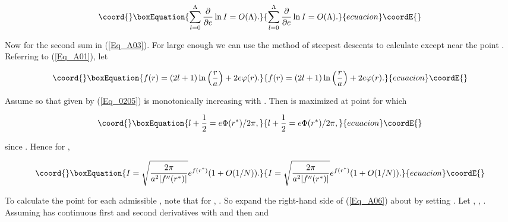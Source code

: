 \documentclass[a4paper,twocolumn,showpacs,preprintnumbers,amsmath,amssymb]{revtex4}
\providecommand{\half}{\frac{1}{2}}
\providecommand{\pdo}[1]{\ensuremath{\frac{\partial }
        {\partial #1 }}}
\begin{document}
\begin{equation}\coord{}\boxEquation{
\label{Eq_A04}
\sum^{\Lambda}_{l=0} \pdo{e} \ln I = O(\Lambda).
}{
\sum^{\Lambda}_{l=0} \pdo{e} \ln I = O(\Lambda).
}{ecuacion}\coordE{}\end{equation} 

Now for the second sum in (\ref{Eq_A03}). For \myHighlight{$\Lambda$}\coordHE{} large enough
we can use the method of steepest descents to calculate \coordHE{} except
near the point \coordHE{}. Referring to (\ref{Eq_A01}), let

\begin{equation}\coord{}\boxEquation{
\label{Eq_A05}
f(r) = (2l+1) \ln \left(\frac{r}{a}\right) + 2e \varphi(r).
}{
f(r) = (2l+1) \ln \left(\frac{r}{a}\right) + 2e \varphi(r).
}{ecuacion}\coordE{}\end{equation}

\noindent
Assume \coordHE{} so that \coordHE{} given by (\ref{Eq_0205}) is
monotonically increasing with \coordHE{}. Then \coordHE{} is maximized at point
\coordHE{} for which

\begin{equation}\coord{}\boxEquation{
\label{Eq_A06}
l + \half = e\Phi(r^{*}) / 2\pi,
}{
l + \half = e\Phi(r^{*}) / 2\pi,
}{ecuacion}\coordE{}\end{equation}

\noindent
since \coordHE{}. Hence for \coordHE{},

\begin{equation}\coord{}\boxEquation{
\label{Eq_A07}
I = \sqrt{\frac{2\pi}{a^2|f''(r^{*})|}} e^{f(r^{*})} (1 + O(1/N)).
}{
I = \sqrt{\frac{2\pi}{a^2|f''(r^{*})|}} e^{f(r^{*})} (1 + O(1/N)).
}{ecuacion}\coordE{}\end{equation}

\noindent
To calculate the point \coordHE{} for each admissible \coordHE{}, note that for
\coordHE{}, \coordHE{}. So expand the right-hand side of
(\ref{Eq_A06}) about \coordHE{} by setting \coordHE{}. 
Let \coordHE{}, \coordHE{}, \coordHE{}. Assuming \coordHE{} has continuous
first and second derivatives with \coordHE{} and \coordHE{} then
\myHighlight{$\delta = (2 / (a^3 |B'(a)|))^{\half} (m/e)^{\half} + O(m/e)$}\coordHE{} and
\end{document}
